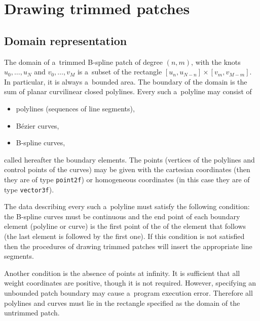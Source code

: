 

\newpage
\section{Drawing trimmed patches}

\subsection{\label{ssect:trimpatch:bound}Domain representation}

The domain of a~trimmed B-spline patch of degree $(n,m)$, with the knots
$u_0,\ldots,u_N$ and $v_0,\ldots,v_M$ is a~subset of the rectangle
$[u_n,u_{N-n}]\times[v_m,v_{M-m}]$. In particular, it is always a~bounded
area. The boundary of the domain is the sum of planar curvilinear closed
polylines. Every such a~polyline may consist of
\begin{itemize}
  \item polylines (sequences of line segments),
  \item B\'{e}zier curves,
  \item B-spline curves,
\end{itemize}
called hereafter the boundary elements.
The points (vertices of the polylines and control points of the curves)
may be given with the cartesian coordinates (then they are of type
\texttt{point2f}) or homogeneous coordinates (in this case
they are of type \texttt{vector3f}).

The data describing every such a~polyline must satisfy the following condition:
the B-spline curves must be continuous and the end point of each boundary
element (polyline or curve) is the first point of the of the element that
follows (the last element is followed by the first one). If this condition
is not satisfied then the procedures of drawing trimmed patches will insert
the appropriate line segments.

Another condition is the absence of points at infinity. It is sufficient
that all weight coordinates are positive, though it is not required.
However, specifying an unbounded patch boundary may cause a~program
execution error. Therefore all polylines and curves must lie in the rectangle
specified as the domain of the untrimmed patch.

